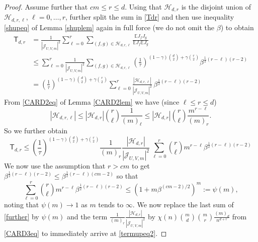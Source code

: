 \documentclass[reqno]{amsart}
\theoremstyle{theorem}
\theoremstyle{definition}
\theoremstyle{remark}
\def\E{\mathbb{E}}
\def\HH{\mathscr{H}}
\newcommand{\1}{{\text{\Large $\mathfrak 1$}}}	%
\numberwithin{equation}{section}
\def\JJ{\mathscr J}
\newcommand{\tkside}[1]{\marginpar{\color{Fuchsia}\footnotesize \tt\bfseries #1}}
\def\TTT{\mathsf T}
\begin{document}
\begin{proof}
Assume further that $cm \le r \le d$.
Using that $\HH_{d,r}$ is the disjoint union of $\HH_{d,r,\ell}$, $\ell=0,\ldots, r$,
further split the sum in \eqref{Tdr} and then
{use inequality \eqref{shupeq} of Lemma \ref{shuplem} again} in full force
(we do not omit the $\beta$) to obtain 
\begin{align*}
\TTT_{d, r} &= \frac{1}{|\JJ_{U,V,m}|^2} 
\sum_{\ell=0}^r \sum_{(f, g) \in \HH_{d, r,\ell}} 
\frac{\E J_f J_g}{\E J_f \E J_g}
\\
&\le 
\sum_{\ell=0}^r \frac{1}{|\JJ_{U,V,m}|^2} \sum_{(f, g) \in \HH_{d, r,\ell}} 
\left( \frac{1}{\tau} \right)^{(1-\gamma)\binom{d}{2} + \gamma\binom{r}{2}}
\beta^{\frac{1}{2}(r - \ell)(r-2)}
\\
&= 
\left( \frac{1}{\tau} \right)^{(1-\gamma)\binom{d}{2} + \gamma\binom{r}{2}}
\sum_{\ell=0}^r 
\frac{|\HH_{d,r,\ell}|}{|\JJ_{U,V,m}|^2}
\,\beta^{\frac{1}{2}(r - \ell)(r-2)}
\end{align*}
From \eqref{CARD2eq} of Lemma \ref{CARD2lem} we have (since $\ell \le r \le d$)
\[
|\HH_{d,r,\ell}| \le {|\HH_{d,r}|} \binom{r}{\ell} \frac{1}{(m)_\ell}
\le  {|\HH_{d,r}|} \binom{r}{\ell} \frac{m^{r-\ell}}{(m)_r}.
\]
So we further obtain
\begin{equation}
\label{further}
\TTT_{d, r} \le \left( \frac{1}{\tau} \right)^{(1-\gamma)\binom{d}{2} + \gamma\binom{r}{2}}
\frac{1}{(m)_r}
\frac{|\HH_{d,r}|}{|\JJ_{U,V,m}|^2}
\, \sum_{\ell=0}^r 
\binom{r}{\ell} m^{r-\ell}
\beta^{\frac{1}{2}(r - \ell)(r-2)}
\end{equation}
We now use the assumption that $r>cm$ to get
$\beta^{\frac{1}{2}(r - \ell)(r-2)} \le \beta^{\frac{1}{2}(r - \ell)(cm-2)}$
so that
\[
\sum_{\ell=0}^r 
\binom{r}{\ell} m^{r-\ell}
\beta^{\frac{1}{2}(r - \ell)(r-2)}
\le \left(1+m \beta^{(cm-2)/2}\right)^m := \psi(m),
\]
noting that $\psi(m) \to 1$ as $m$ tends to $\infty$.
We now replace the last sum of \eqref{further} by $\psi(m)$
and the term
$\frac{1}{(m)_r}
\frac{|\HH_{d,r}|}{|\JJ_{U,V,m}|^2}$
by 
$\chi(n) \binom{m}{d} \binom{m}{r} \frac{(m)_d}{n^{d+r}}$ from \eqref{CARD3eq}
to immediately arrive at \eqref{termupeq2}.
\end{proof}
\end{document}
